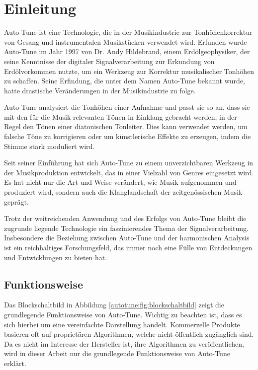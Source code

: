 %
%
%
%
\section{Einleitung\label{autotune:section:teil0}}
Auto-Tune ist eine Technologie, die in der Musikindustrie zur Tonhöhenkorrektur von Gesang und instrumentalen Musikstücken verwendet wird.
Erfunden wurde Auto-Tune im Jahr 1997 von Dr. Andy Hildebrand, einem Erdölgeophysiker,
der seine Kenntnisse der digitaler Signalverarbeitung zur Erkundung von Erdölvorkommen nutzte,
um ein Werkzeug zur Korrektur musikalischer Tonhöhen zu schaffen.
Seine Erfindung, die unter dem Namen Auto-Tune bekannt wurde, hatte drastische Veränderungen in der Musikindustrie zu folge.

Auto-Tune analysiert die Tonhöhen einer Aufnahme und passt sie so an, dass sie mit den für die Musik relevanten Tönen in Einklang gebracht werden,
in der Regel den Tönen einer diatonischen Tonleiter.
Dies kann verwendet werden, um falsche Töne zu korrigieren oder um künstlerische Effekte zu erzeugen, indem die Stimme stark moduliert wird.

Seit seiner Einführung hat sich Auto-Tune zu einem unverzichtbaren Werkzeug in der Musikproduktion entwickelt,
das in einer Vielzahl von Genres eingesetzt wird.
Es hat nicht nur die Art und Weise verändert, wie Musik aufgenommen und produziert wird,
sondern auch die Klanglandschaft der zeitgenössischen Musik geprägt.

Trotz der weitreichenden Anwendung und des Erfolgs von Auto-Tune bleibt die zugrunde liegende Technologie ein faszinierendes Thema der Signalverarbeitung.
Insbesondere die Beziehung zwischen Auto-Tune und der harmonischen Analysis ist ein reichhaltiges Forschungsfeld,
das immer noch eine Fülle von Entdeckungen und Entwicklungen zu bieten hat.


\subsection{Funktionsweise
\label{autotune:subsection:funktionsweise}}
Das Blockschaltbild in Abbildung \ref{autotune:fig:blockschaltbild} zeigt die grundlegende Funktionsweise von Auto-Tune.
Wichtig zu beachten ist, dass es sich hierbei um eine vereinfachte Darstellung handelt.
Kommerzelle Produkte basieren oft auf proprietären Algorithmen, welche nicht öffentlich zugänglich sind.
Da es nicht im Interesse der Hersteller ist, ihre Algorithmen zu veröffentlichen,
wird in dieser Arbeit nur die grundlegende Funktionsweise von Auto-Tune erklärt.

